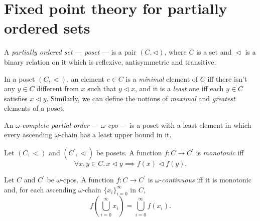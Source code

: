 \section{Fixed point theory for partially ordered sets}

\begin{dfn}
  A \emph{partially ordered set} --- \emph{poset} --- is a pair
  \((C, \lhd)\), where \(C\) is a set and \({}\lhd{}\) is a binary relation
  on it which is reflexive, antisymmetric and transitive.
\end{dfn}

In a poset \((C, {}\lhd)\), an element \(c \in C\) is a \emph{minimal}
element of \(C\) iff there isn't any \(y \in C\) different from \(x\) such
that \(y \lhd x\), and it is a \emph{least} one iff each \(y \in C\) satisfies
\(x \lhd y\).
Similarly, we can define the notions of \emph{maximal} and \emph{greatest}
elements of a poset.


\begin{dfn}
  An \(\omega{}\)-\emph{complete partial order} --- \(\omega{}\)-\emph{cpo} ---
  is a poset with a least element in which every ascending \(\omega{}\)-chain
  has a least upper bound in it.
\end{dfn}

\begin{dfn}
  Let \((C, {}<)\) and \((C^\prime, {}\lhd)\) be posets.
  A function \(f \colon C \to C^\prime\) is \emph{monotonic} iff
  \[
    \forall x,y \in C.\, x \lhd y \implies f(x) \lhd f(y).
  \]
\end{dfn}

\begin{dfn}
  Let \(C\) and \(C^\prime\) be \(\omega{}\)-cpos.
  A function \(f \colon C \to C^\prime\) is \(\omega{}\)-\emph{continuous}
  iff it is monotonic and, for each ascending \(\omega{}\)-chain
  \(\lbrace x_i \rbrace_{i=0}^\infty\) in \(C\),
  \[
  f\left(\bigcup_{i=0}^\infty x_i\right) = \bigcup_{i=0}^\infty f(x_i).
  \]
\end{dfn}

